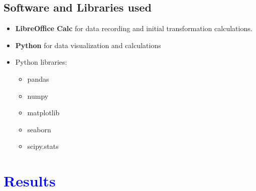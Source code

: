 \documentclass[10pt,a4paper]{article}
\begin{document}
				\subsection{Software and Libraries used}
				\begin{itemize}
					\item \textbf{LibreOffice Calc} for data recording and initial transformation calculations.
					\item \textbf{Python} for data visualization and calculations
					\item Python libraries:
					\begin{itemize}
						\item pandas
						\item numpy
						\item matplotlib
						\item seaborn
						\item scipy.stats
					\end{itemize}
				\end{itemize}		
				
			\section{\textcolor{blue}{Results}}
\end{document}
